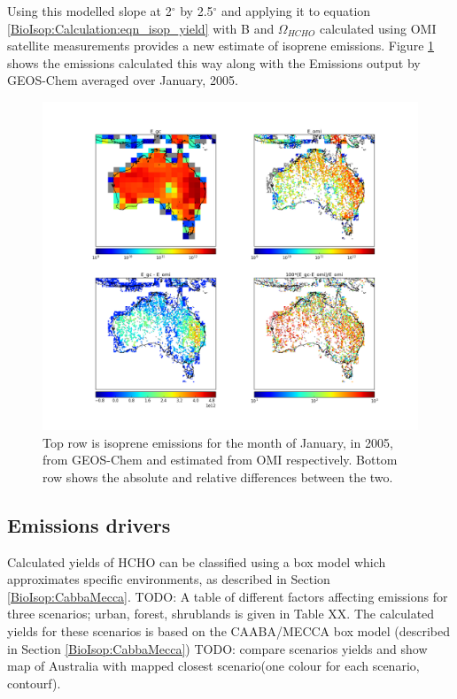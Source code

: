     Using this modelled slope at 2$^{\circ}$ by 2.5$^{\circ}$ and applying it to equation \ref{BioIsop:Calculation:eqn_isop_yield} with B and $\Omega_{HCHO}$ calculated using OMI satellite measurements provides a new estimate of isoprene emissions.
    Figure \ref{BioIsop:Calculation:fig_E_isop_200501} shows the emissions calculated this way along with the Emissions output by GEOS-Chem averaged over January, 2005.
    \begin{figure}[!htbp]
      \includegraphics[width=\textwidth]{Figures/Isoprene/E_Comparison.png}
      \caption{%
        Top row is isoprene emissions for the month of January, in 2005, from GEOS-Chem and estimated from OMI respectively.
        Bottom row shows the absolute and relative differences between the two.
      }
      \label{BioIsop:Calculation:fig_E_isop_200501}
    \end{figure}
  
  \subsection{Emissions drivers}
    Calculated yields of HCHO can be classified using a box model which approximates specific environments, as described in Section \ref{BioIsop:CabbaMecca}.
    TODO: A table of different factors affecting emissions for three scenarios; urban, forest, shrublands is given in Table XX.
    The calculated yields for these scenarios is based on the CAABA/MECCA box model (described in Section \ref{BioIsop:CabbaMecca}) TODO: compare scenarios yields and show map of Australia with mapped closest scenario(one colour for each scenario, contourf).
    
